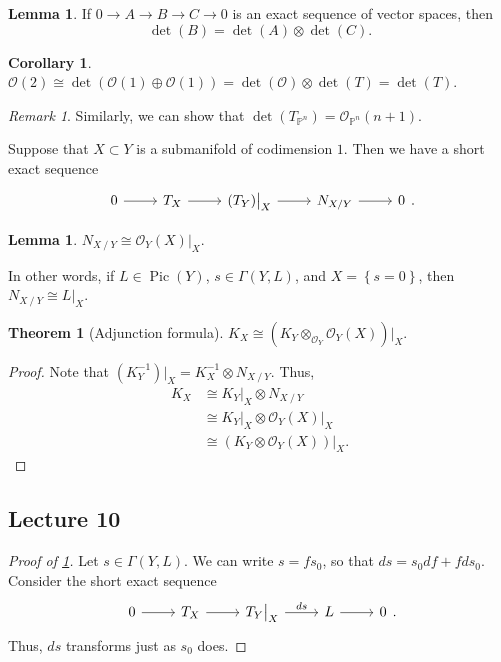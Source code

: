 \documentclass[10pt,letterpaper,cm]{nupset}
\theoremstyle{definition}
\theoremstyle{theorem}
\newtheorem{theorem}[defn]{Theorem}
\newtheorem{lemma}[defn]{Lemma}
\newtheorem{corollary}[defn]{Corollary}
\theoremstyle{remark}
\newtheorem{remark}[defn]{Remark}
\renewcommand{\O}{\mathcal O}
\renewcommand{\P}{\mathbb P}
\newcommand{\1}{\mathbb{1}}
\newcommand{\0}{\vec 0}
\DeclareMathOperator{\pic}{Pic}
\begin{document}
\begin{lemma}
If $0 \to A \to B \to C \to 0$ is an exact sequence of vector spaces, then $$\det(B) = \det(A) \otimes \det(C).$$
\end{lemma}

\begin{corollary}
$\O(2) \cong \det \left(\O(1) \oplus \O(1)\right) =\det(\O) \otimes \det(T) = \det(T)$.
\end{corollary}

\begin{remark}
Similarly, we can show that $\det\left(T_{\P^n}\right) =\O_{\P^n}(n+1)$.
\end{remark}

\medskip

Suppose that $X\subset Y$ is a submanifold of codimension $1$. Then we have a short exact sequence
\[
\begin{tikzcd}
0 \arrow[r] & T_X \arrow[r] & \left(T_Y\right)\bigr\rvert_X \arrow[r] & N_{X\mathbin{/}Y} \arrow[r] & 0
\end{tikzcd}.
\]

\begin{lemma}\label{norm}
$N_{X\mathbin{/}Y} \cong \O_Y\left(X\right)\bigr\rvert_X$.
\end{lemma}

In other words, if $L\in \pic(Y)$, $s\in \Gamma\left(Y, L\right)$, and $X = \left\{s=0\right\}$, then $N_{X\mathbin{/}Y} \cong L\bigr\rvert_X$.

\begin{theorem}[Adjunction formula]
$K_X \cong \left(K_Y \otimes_{\O_Y} \O_Y(X)\right)\bigr\rvert_X$.
\end{theorem}
\begin{proof}
Note that $\left(K_Y^{-1}\right)\bigr\rvert_X = K_X^{-1} \otimes N_{X\mathbin{/}Y}$. Thus,
\begin{align*}
K_X & \cong K_Y\bigr\rvert_X \otimes N_{X\mathbin{/}Y}  
\\ & \cong K_Y\bigr\rvert_X \otimes  \O_Y(X)\bigr\rvert_X
\\ & \cong \left(K_Y \otimes \O_Y(X)\right)\bigr\rvert_X
.\end{align*}
\end{proof}


\subsection{Lecture 10}

\begin{proof}[Proof of \cref{norm}]
Let $s\in \Gamma\left(Y, L\right)$. We can write $s = f{s_0}$, so that $d{s} = s_0d{f} + fd{s_0}$. Consider the short exact sequence
\[
\begin{tikzcd}
0 \arrow[r] & T_X \arrow[r] & T_Y\bigr\rvert_X \arrow[r, "ds"] & L \arrow[r] & 0
\end{tikzcd}.
\] Thus, $ds$ transforms just as $s_0$ does.
\end{proof}
\end{document}
